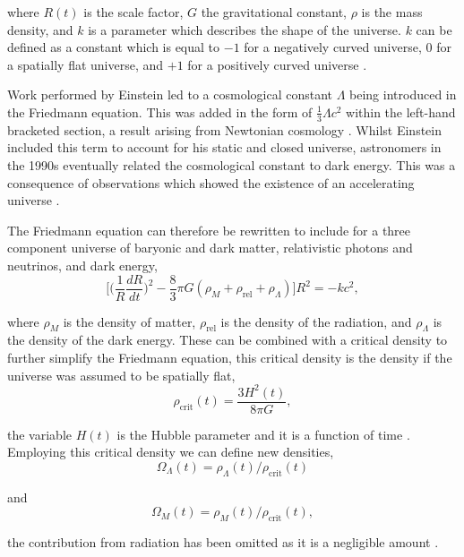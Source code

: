 \documentclass[twocolumn]{revtex4}
\begin{document}
where $R(t)$ is the scale factor, $G$ the gravitational constant, $\rho$ is the mass density, and $k$ is a parameter which describes the shape of the universe. $k$ can be defined as a constant which is equal to $-1$ for a negatively curved universe, $0$ for a spatially flat universe, and $+1$ for a positively curved universe \cite{mod_ast, longair}. 

Work performed by Einstein led to a cosmological constant $\Lambda$ being introduced in the Friedmann equation. This was added in the form of $\tfrac{1}{3}\Lambda c^2$ within the left-hand bracketed section, a result arising from Newtonian cosmology \cite{mod_ast}. Whilst Einstein included this term to account for his static and closed universe, astronomers in the 1990s eventually related the cosmological constant to dark energy. This was a consequence of observations which showed the existence of an accelerating universe \cite{mod_ast}. 

The Friedmann equation can therefore be rewritten to include for a three component universe of baryonic and dark matter, relativistic photons and neutrinos, and dark energy, 
\begin{equation}
\Big[ \Big( \frac{1}{R} \frac{dR}{dt} \Big)^2 - \frac{8}{3} \pi G (\rho_{M} + \rho_{\text{rel}} + \rho_{\Lambda} )\Big] R^2 = -kc^2,
\end{equation}

where $\rho_{M}$ is the density of matter, $\rho_{\text{rel}}$ is the density of the radiation, and $\rho_{\Lambda}$ is the density of the dark energy. These can be combined with a critical density to further simplify the Friedmann equation, this critical density is the density if the universe was assumed to be spatially flat,
\begin{equation}
\rho_{\text{crit}} (t) = \frac{3 H^2(t)}{8 \pi G},
\end{equation}

the variable $H(t)$ is the Hubble parameter and it is a function of time \cite{mod_ast}. Employing this critical density we can define new densities,
\begin{equation}
\Omega_{\Lambda}(t) = \rho_{\Lambda}(t) / \rho_{\text{crit}}(t)
\end{equation}

and 
\begin{equation}
\Omega_{M}(t) = \rho_{M}(t) / \rho_{\text{crit}}(t),
\end{equation}

the contribution from radiation has been omitted as it is a negligible amount \cite{mod_ast}.
\end{document}
